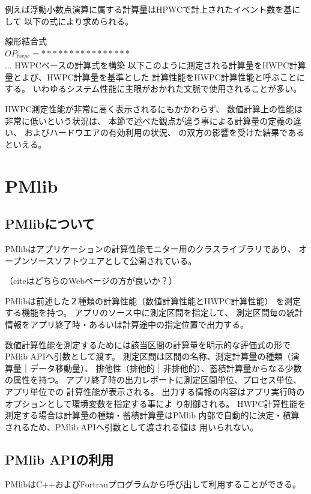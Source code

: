\documentclass[submit,techrep,noauthor]{ipsj}
\begin{document}
例えば浮動小数点演算に属する計算量はHPWCで計上されたイベント数を基にして
以下の式により求められる。

{ \color{blue}
線形結合式\\
\begin{math}
OP_{hwpc} = ****************
\end{math}\\
... HWPCベースの計算式を構築
}
以下このように測定される計算量をHWPC計算量とよび、HWPC計算量を基準とした
計算性能をHWPC計算性能と呼ぶことにする。
いわゆるシステム性能に主眼がおかれた文脈で使用されることが多い。

HWPC測定性能が非常に高く表示されるにもかかわらず、
数値計算上の性能は非常に低いという状況は、
本節で述べた観点が違う事による計算量の定義の違い、
およびハードウエアの有効利用の状況、
の双方の影響を受けた結果であるといえる。


\section{PMlib}

\subsection {PMlibについて}

PMlibはアプリケーションの計算性能モニター用のクラスライブラリであり、
オープンソースソフトウエアとして公開されている。
\cite{PMlib1:webpage} \par
\cite{PMlib2:webpage} \par
{ \color{blue} \par
（citeはどちらのWebページの方が良いか？）
} \par
PMlibは前述した２種類の計算性能（数値計算性能とHWPC計算性能）
を測定する機能を持つ。
アプリのソース中に測定区間を指定して、
測定区間毎の統計情報をアプリ終了時・あるいは計算途中の指定位置で出力する。

数値計算性能を測定するためには該当区間の計算量を明示的な評価式の形で
PMlib APIへ引数として渡す。
測定区間は区間の名称、測定計算量の種類（演算量｜データ移動量）、
排他性（排他的｜非排他的）、蓄積計算量からなる少数の属性を持つ。
アプリ終了時の出力レポートに測定区間単位、プロセス単位、アプリ単位での
計算性能が表示される。
出力する情報の内容はアプリ実行時のオプションとして環境変数を指定する事によ
り制御される。
HWPC計算性能を測定する場合は計算量の種類・蓄積計算量はPMlib
内部で自動的に決定・積算されるため、PMlib APIへ引数として渡される値は
用いられない。

\subsection {PMlib APIの利用}
PMlibはC++およびFortranプログラムから呼び出して利用することができる。
\end{document}
